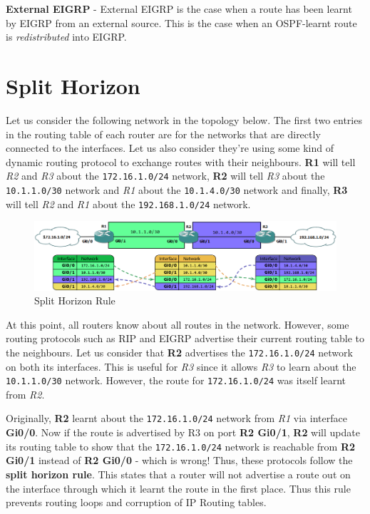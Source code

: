 \noindent
\textbf{External EIGRP} - External EIGRP is the case when a route has been learnt by EIGRP from an external source. This is the case when an OSPF-learnt route is \textit{redistributed} into EIGRP. 

\section{Split Horizon}
Let us consider the following network in the topology below. The first two entries in the routing table of each router are for the networks that are directly connected to the interfaces. Let us also consider they're using some kind of dynamic routing protocol to exchange routes with their neighbours. \textbf{R1} will tell \textit{R2} and \textit{R3} about the \verb|172.16.1.0/24| network, \textbf{R2} will tell \textit{R3} about the \verb|10.1.1.0/30| network and \textit{R1} about the \verb|10.1.4.0/30| network and finally, \textbf{R3} will tell \textit{R2} and \textit{R1} about the \verb|192.168.1.0/24| network. 

\begin{figure}[H]
\centering
\includegraphics[width=0.9\linewidth]{"ICND1/2. Routers/chapters/3.3.a Split Horizon"}
\caption{Split Horizon Rule}
\label{fig:9.5.a}
\end{figure}
\vspace{-10pt}

\noindent
At this point, all routers know about all routes in the network. However, some routing protocols such as RIP and EIGRP advertise their current routing table to the neighbours. Let us consider that \textbf{R2} advertises the \verb|172.16.1.0/24| network on both its interfaces. This is useful for \textit{R3} since it allows \textit{R3} to learn about the \verb|10.1.1.0/30| network. However, the route for \verb|172.16.1.0/24| was itself learnt from \textit{R2}.

Originally, \textbf{R2} learnt about the \verb|172.16.1.0/24| network from \textit{R1} via interface \textbf{Gi0/0}. Now if the route is advertised by R3 on port \textbf{R2 Gi0/1}, \textbf{R2} will update its routing table to show that the \verb|172.16.1.0/24| network is reachable from \textbf{R2 Gi0/1} instead of \textbf{R2 Gi0/0} - which is wrong! Thus, these protocols follow the \textbf{split horizon rule}. This states that a router will not advertise a route out on the interface through which it learnt the route in the first place. Thus this rule prevents routing loops and corruption of IP Routing tables.  


